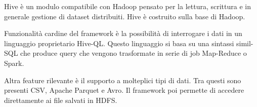 Hive è un modulo compatibile con Hadoop pensato per la lettura, scrittura e in generale gestione di dataset distribuiti.
Hive è costruito sulla base di Hadoop.

Funzionalità cardine del framework è la possibilità di interrogare i dati in un linguaggio proprietario Hive-QL.
Questo linguaggio si basa su una sintassi simil-SQL che produce query che vengono trasformate in serie di job Map-Reduce o Spark.

Altra feature rilevante è il supporto a molteplici tipi di dati.
Tra questi sono presenti CSV, Apache Parquet e Avro.
Il framework poi permette di accedere direttamente ai file salvati in HDFS.